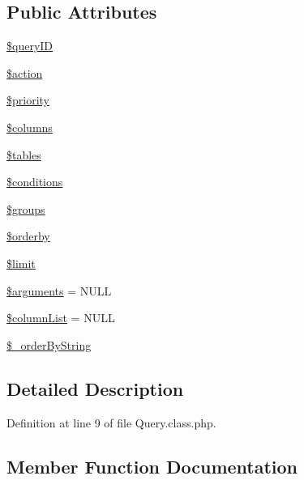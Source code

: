 \subsection*{Public Attributes}
\begin{DoxyCompactItemize}
\item 
\hyperlink{classQuery_a67666b2fcd6c60e73d8329f7d22044dc}{\$query\+I\+D}
\item 
\hyperlink{classQuery_a62c36010085369fc0508ea548660be9f}{\$action}
\item 
\hyperlink{classQuery_a4d64f61fd525a70ebc2aaa6ab8291e20}{\$priority}
\item 
\hyperlink{classQuery_a7cf97254cbd55fdbb9e149723498d9ba}{\$columns}
\item 
\hyperlink{classQuery_a5c74163d1615b141456b123c11fa9d92}{\$tables}
\item 
\hyperlink{classQuery_a5c71d786a82b2cc014968d2553b6bc9d}{\$conditions}
\item 
\hyperlink{classQuery_a76992fbfae6d700e65dfde28911a2475}{\$groups}
\item 
\hyperlink{classQuery_aa955216a83dfe57cdd9600b44b38ebac}{\$orderby}
\item 
\hyperlink{classQuery_abe481cf8b7f42b513a4f64cf7fb0ffea}{\$limit}
\item 
\hyperlink{classQuery_a49166e3c5f5198e4b899c8ee47b6258a}{\$arguments} = N\+U\+L\+L
\item 
\hyperlink{classQuery_a113bcdfdc3bf6acef684a06ae324334a}{\$column\+List} = N\+U\+L\+L
\item 
\hyperlink{classQuery_aaf035e5cfac7afe46163a6ba4c55c34b}{\$\+\_\+order\+By\+String}
\end{DoxyCompactItemize}


\subsection{Detailed Description}


Definition at line 9 of file Query.\+class.\+php.



\subsection{Member Function Documentation}
\hypertarget{classQuery_a8c48087275e1fb408298c5c6295bbf20}{}
